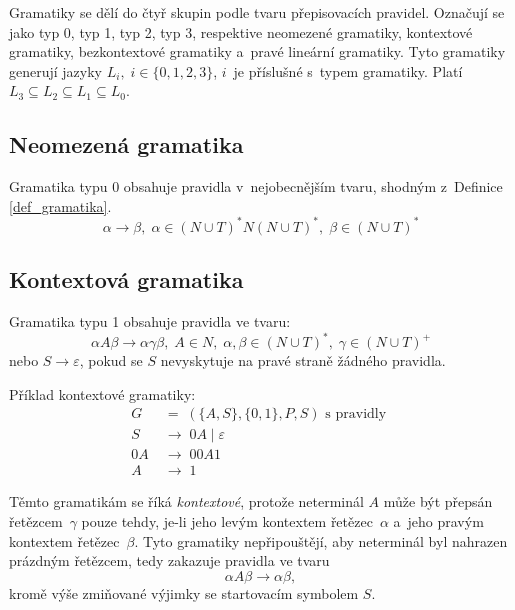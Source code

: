 Gramatiky se dělí do čtyř skupin podle tvaru přepisovacích pravidel.
Označují se jako typ 0, typ 1, typ 2, typ 3, respektive neomezené gramatiky, kontextové gramatiky, bezkontextové gramatiky a~pravé lineární gramatiky.
Tyto gramatiky generují jazyky $L_i,\; i \in \{0, 1, 2, 3\}$, $i$~je příslušné s~typem gramatiky.
Platí $L_3 \subseteq L_2 \subseteq L_1 \subseteq L_0$.

\subsection*{Neomezená gramatika}
Gramatika typu 0 obsahuje pravidla v~nejobecnějším tvaru, shodným z~Definice \ref{def_gramatika}.
\begin{equation*}
    \alpha \rightarrow \beta,\; \alpha \in (N \cup T)^*N(N \cup T)^*,\; \beta \in (N \cup T)^*
\end{equation*}

\subsection*{Kontextová gramatika}
Gramatika typu 1 obsahuje pravidla ve tvaru:
\begin{equation*}
    \alpha A \beta \rightarrow \alpha \gamma \beta,\; A \in N,\; \alpha, \beta \in (N \cup T)^*,\; \gamma \in (N \cup T)^+
\end{equation*}
nebo $S \rightarrow \varepsilon$, pokud se $S$ nevyskytuje na pravé straně žádného pravidla.
\begin{example}
    Příklad kontextové gramatiky:
    \begin{align*}
        G \; &= \; (\{A, S\}, \{0, 1\}, P, S) \text{ s~pravidly }\\
        S~\; &\rightarrow \; 0A \; | \; \varepsilon \\ 
        0A \; &\rightarrow \; 00A1 \\
        A~\; &\rightarrow \; 1
    \end{align*}
\end{example}

Těmto gramatikám se říká \emph{kontextové}, protože neterminál $A$ může být přepsán řetězcem~$\gamma$ pouze tehdy, je-li jeho levým kontextem řetězec~$\alpha$ a~jeho pravým kontextem řetězec~$\beta$.
Tyto gramatiky nepřipouštějí, aby neterminál byl nahrazen prázdným řetězcem, tedy zakazuje pravidla ve tvaru
\begin{equation*}
    \alpha A \beta \rightarrow \alpha \beta,
\end{equation*}
kromě výše zmiňované výjimky se startovacím symbolem $S$.

